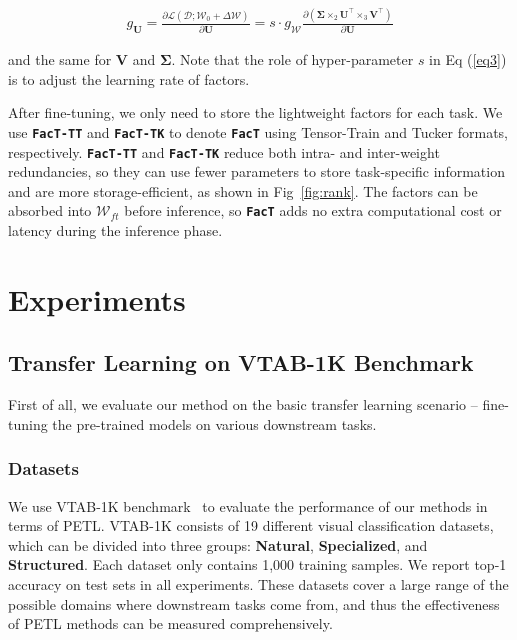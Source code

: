 \begin{equation}
\begin{aligned}
g_{\boldsymbol{U}} = \frac{\partial\mathcal{L}(\mathcal{D};\boldsymbol{\mathcal{W}}_0+\Delta\boldsymbol{\mathcal{W}})}{\partial\boldsymbol{U}}=s\cdot g_{\boldsymbol{\mathcal{W}}}\frac{\partial(\boldsymbol{\Sigma}\times_2\boldsymbol{U}^\intercal\times_3\boldsymbol{V}^\intercal)}{\partial\boldsymbol{U}}
\end{aligned}
\label{eq3}
\end{equation}

and the same for $\boldsymbol{V}$ and $\boldsymbol{\Sigma}$. Note that the role of hyper-parameter $s$ in Eq (\ref{eq3}) is to adjust the learning rate of factors.

After fine-tuning, we only need to store the lightweight factors for each task. We use \texttt{\textbf{FacT-TT}} and \texttt{\textbf{FacT-TK}} to denote \texttt{\textbf{FacT}} using Tensor-Train and Tucker formats, respectively. \texttt{\textbf{FacT-TT}} and \texttt{\textbf{FacT-TK}} reduce both intra- and inter-weight redundancies, so they can use fewer parameters to store task-specific information and are more storage-efficient, as shown in Fig~\ref{fig:rank}. The factors can be absorbed into $\boldsymbol{\mathcal{W}}_{ft}$ before inference, so \texttt{\textbf{FacT}} adds no extra computational cost or latency during the inference phase.

\section{Experiments}
\subsection{Transfer Learning on VTAB-1K Benchmark} First of all, we evaluate our method on the basic transfer learning scenario -- fine-tuning the pre-trained models on various downstream tasks.

\subsubsection{Datasets} We use VTAB-1K benchmark~\cite{vtab} to evaluate the performance of our methods in terms of PETL. VTAB-1K consists of 19 different visual classification datasets, which can be divided into three groups: \textbf{Natural}, \textbf{Specialized}, and \textbf{Structured}.
Each dataset only contains 1,000 training samples. We report top-1 accuracy on test sets in all experiments. These datasets cover a large range of the possible domains where downstream tasks come from, and thus the effectiveness of PETL methods can be measured comprehensively.


